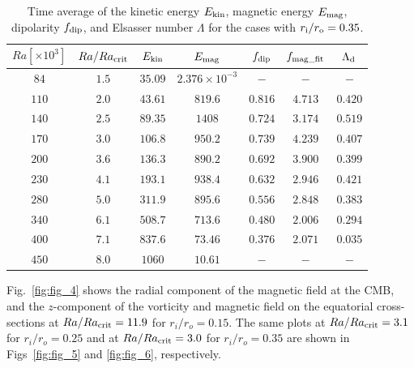  \begin{table}
\caption{Time average of the kinetic energy $E_{\rm kin}$, magnetic energy $E_{\rm mag}$, dipolarity $f_{\rm dip}$, and Elsasser number $\Lambda$ for the cases with $r_{\rm i}/r_{\rm o} = 0.35$.}
  \begin{tabular}{ccccccc}
    \hline
     $Ra[\times 10^3]$  &  $Ra/Ra_{\rm crit}$&  $E_{\rm kin}$  &  $E_{\rm mag}$ & $f_{\rm dip}$ & $f_{\rm mag\_fit}$ & $\Lambda_{\rm d}$\\
    \hline
      $84$    & $1.5$ &  $35.09$ & $2.376 \times 10^{-3}$ & $-$ & $-$ & $-$\\
     $110$  & $2.0$ &  $43.61$ & $819.6$ & $0.816$ & $4.713$ & $0.420$\\
     $140$  & $2.5$ &  $89.35$ & $1408$ & $0.724$ & $3.174$ & $0.519$\\
     $170$  & $3.0$ &  $106.8$ & $950.2$ & $0.739$ & $4.239$ & $0.407$\\
     $200$  & $3.6$ &  $136.3$ & $890.2$ & $0.692$ & $3.900$ & $0.399$\\
     $230$  & $4.1$ &  $193.1$ & $938.4$ & $0.632$ & $2.946$ & $0.421$\\
     $280$  & $5.0$ &  $311.9$ & $895.6$ & $0.556$ & $2.848$ & $0.383$\\
     $340$  & $6.1$ &  $508.7$ & $713.6$ & $0.480$ & $2.006$ & $0.294$\\
     $400$  & $7.1$ &  $837.6$ & $73.46$ & $0.376$ & $2.071$ & $0.035$\\
     $450$  & $8.0$ &  $1060$ & $10.61$ & $-$ & $-$ & $-$\\
    \hline
  \end{tabular}
\label{table:Summary_35}
 \end{table}
%
{\color{red} %
Fig.~\ref{fig:fig_4} shows the radial component of the magnetic field at the CMB, and the $z$-component of the vorticity and magnetic field on the equatorial cross-sections at $Ra/Ra_{\rm crit} = 11.9$ for $r_i/r_o = 0.15$. 
}
The same plots at $Ra/Ra_{\rm crit} = 3.1$ for $r_i/r_o = 0.25$ and at $Ra/Ra_{\rm crit} = 3.0$ for $r_i/r_o = 0.35$ are shown in Figs~\ref{fig:fig_5} and \ref{fig:fig_6}, respectively. 
